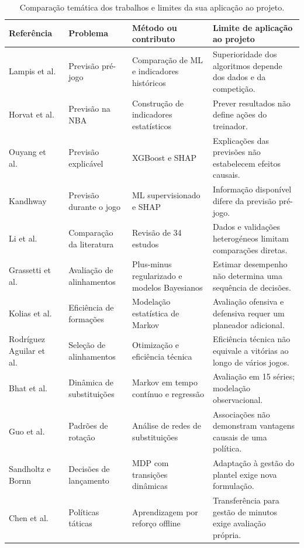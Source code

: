 \begin{table}[tp]
\centering
\small
\singlespacing
\caption{Comparação temática dos trabalhos e limites da sua aplicação ao projeto.}
\label{tab:comparacao-estado-arte}
\renewcommand{\arraystretch}{1.18}
\begin{tabular}{@{}
 >{\raggedright\arraybackslash}p{}
 >{\raggedright\arraybackslash}p{}
 >{\raggedright\arraybackslash}p{}
 >{\raggedright\arraybackslash}p{}@{}}
\toprule
Referência & Problema & Método ou contributo & Limite de aplicação ao projeto \\
\midrule
Lampis et al.~\cite{lampis2023} & Previsão pré-jogo & Comparação de ML e indicadores históricos & Superioridade dos algoritmos depende dos dados e da competição. \\
Horvat et al.~\cite{horvat2023} & Previsão na NBA & Construção de indicadores estatísticos & Prever resultados não define ações do treinador. \\
Ouyang et al.~\cite{ouyang2024} & Previsão explicável & XGBoost e SHAP & Explicações das previsões não estabelecem efeitos causais. \\
Kandhway~\cite{kandhway2025} & Previsão durante o jogo & ML supervisionado e SHAP & Informação disponível difere da previsão pré-jogo. \\
Li et al.~\cite{li2025} & Comparação da literatura & Revisão de 34 estudos & Dados e validações heterogéneos limitam comparações diretas. \\
\midrule
Grassetti et al.~\cite{grassetti2021} & Avaliação de alinhamentos & Plus-minus regularizado e modelos Bayesianos & Estimar desempenho não determina uma sequência de decisões. \\
Kolias et al.~\cite{kolias2022} & Eficiência de formações & Modelação estatística de Markov & Avaliação ofensiva e defensiva requer um planeador adicional. \\
Rodríguez Aguilar et al.~\cite{rodriguez2020} & Seleção de alinhamentos & Otimização e eficiência técnica & Eficiência técnica não equivale a vitórias ao longo de vários jogos. \\
\midrule
Bhat et al.~\cite{bhatSubstitutions} & Dinâmica de substituições & Markov em tempo contínuo e regressão & Avaliação em 15 séries; modelação observacional. \\
Guo et al.~\cite{guo2023} & Padrões de rotação & Análise de redes de substituições & Associações não demonstram vantagens causais de uma política. \\
Sandholtz e Bornn~\cite{sandholtz2020} & Decisões de lançamento & MDP com transições dinâmicas & Adaptação à gestão do plantel exige nova formulação. \\
Chen et al.~\cite{chen2022} & Políticas táticas & Aprendizagem por reforço offline & Transferência para gestão de minutos exige avaliação própria. \\
\bottomrule
\end{tabular}
\end{table}

